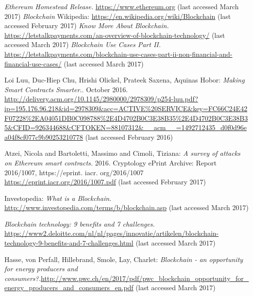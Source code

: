 \begin{thebibliography}{99}
\emph{Ethereum Homestead Release.} \url{https://www.ethereum.org} (last accessed March 2017)
\emph{Blockchain} Wikipedia: \url{https://en.wikipedia.org/wiki/Blockchain} (last accessed February 2017)
\emph{Know More About Blockchain.} \url{https://letstalkpayments.com/an-overview-of-blockchain-technology/} (last accessed March 2017)
\emph{Blockchain Use Cases Part II.} \url{https://letstalkpayments.com/blockchain-use-cases-part-ii-non-financial-and-financial-use-cases/} (last accessed March 2017)


Loi Luu, Duc-Hiep Chu, Hrishi Olickel, Prateek Saxena, Aquinas Hobor: \emph{Making Smart Contracts Smarter.}. October 2016. \url{http://delivery.acm.org/10.1145/2980000/2978309/p254-luu.pdf?ip=195.176.96.218&id=2978309&acc=ACTIVE\%20SERVICE&key=FC66C24E42F07228\%2EA04051DB0C098788\%2E4D4702B0C3E38B35\%2E4D4702B0C3E38B35&CFID=926344688&CFTOKEN=88107312&__acm__=1492712435_d0f0d96ea04f8cf077c9b90253210778} (last accessed February 2016)

Atzei, Nicola and Bartoletti, Massimo and Cimoli, Tiziana: \emph{A survey of attacks on Ethereum smart contracts.} 2016. Cryptology ePrint Archive: Report 2016/1007, https://eprint. iacr. org/2016/1007 \url{https://eprint.iacr.org/2016/1007.pdf} (last accessed February 2017)

Investopedia: \emph{What is a Blockchain.} \url{http://www.investopedia.com/terms/b/blockchain.asp} (last accessed March 2017)

\emph{Blockchain technology: 9 benefits and 7 challenges.} \url{https://www2.deloitte.com/nl/nl/pages/innovatie/artikelen/blockchain-technology-9-benefits-and-7-challenges.html} (last accessed March 2017)

Hasse, von Perfall, Hillebrand, Smole, Lay, Charlet: \emph{Blockchain - an opportunity for energy producers and consumers?.}\url{http://www.pwc.ch/en/2017/pdf/pwc_blockchain_opportunity_for_energy_producers_and_consumers_en.pdf} (last accessed March 2017)


\end{thebibliography}
